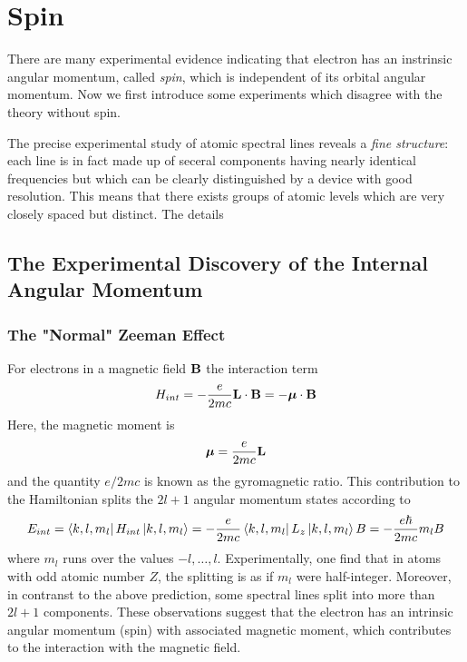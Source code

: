 \chapter{Spin}
There are many experimental evidence indicating that electron has an instrinsic angular momentum, called \emph{spin}, which is independent of its orbital angular momentum. Now we first introduce some experiments which disagree with the theory without spin.

\begin{ex}
    The precise experimental study of atomic spectral lines reveals a \emph{fine structure}: each line is in fact made up of seceral components having nearly identical frequencies but which can be clearly distinguished by a device with good resolution. This means that there exists groups of atomic levels which are very closely spaced but distinct. The details 
    
\end{ex}

\section{The Experimental Discovery of the Internal Angular Momentum}
\subsection{The "Normal" Zeeman Effect}

For electrons in a magnetic field $\mathbf{B}$ the interaction term 
\begin{align}
    H_{int} = - \frac{e}{2mc} \mathbf{L} \cdot \mathbf{B} = - \boldsymbol{\mu} \cdot \mathbf{B}
\end{align}
Here, the magnetic moment is 
\begin{align}
    \boldsymbol{\mu} = \frac{e}{2mc} \mathbf{L}
\end{align}
and the quantity $e/2mc$ is known as the gyromagnetic ratio. This contribution to the Hamiltonian splits the $2l+1$ angular momentum states according to 
\begin{align*}
    E_{int} = \bra{k,l,m_l} H_{int} \ket{k,l,m_l} = - \frac{e}{2mc} \bra{k,l,m_l} L_z \ket{k,l,m_l} B = - \frac{e \hbar}{2mc} m_l B
\end{align*}
where $m_l$ runs over the values $-l,\dots,l$. Experimentally, one find that in atoms with odd atomic number $Z$, the splitting is as if $m_l$ were half-integer. Moreover, in contranst to the above prediction, some spectral lines split into more than $2l+1$ components. These observations suggest that the electron has an intrinsic angular momentum (spin) with associated magnetic moment, which contributes to the interaction with the magnetic field.

